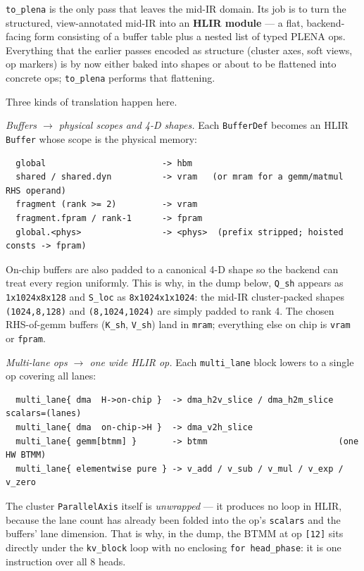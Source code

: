 \documentclass[
  10pt,
]{article}
\begin{document}
\texttt{to\_plena} is the only pass that leaves the mid-IR domain. Its
job is to turn the structured, view-annotated mid-IR into an
\textbf{HLIR module} --- a flat, backend-facing form consisting of a
buffer table plus a nested list of typed PLENA ops. Everything that the
earlier passes encoded as structure (cluster axes, soft views, op
markers) is by now either baked into shapes or about to be flattened
into concrete ops; \texttt{to\_plena} performs that flattening.

Three kinds of translation happen here.

\emph{Buffers \(\rightarrow\) physical scopes and 4-D shapes.} Each
\texttt{BufferDef} becomes an HLIR \texttt{Buffer} whose scope is the
physical memory:

\begin{verbatim}
  global                       -> hbm
  shared / shared.dyn          -> vram   (or mram for a gemm/matmul RHS operand)
  fragment (rank >= 2)         -> vram
  fragment.fpram / rank-1      -> fpram
  global.<phys>                -> <phys>  (prefix stripped; hoisted consts -> fpram)
\end{verbatim}

On-chip buffers are also padded to a canonical 4-D shape so the backend
can treat every region uniformly. This is why, in the dump below,
\texttt{Q\_sh} appears as \texttt{1x1024x8x128} and \texttt{S\_loc} as
\texttt{8x1024x1x1024}: the mid-IR cluster-packed shapes
\texttt{(1024,8,128)} and \texttt{(8,1024,1024)} are simply padded to
rank 4. The chosen RHS-of-gemm buffers (\texttt{K\_sh}, \texttt{V\_sh})
land in \texttt{mram}; everything else on chip is \texttt{vram} or
\texttt{fpram}.

\emph{Multi-lane ops \(\rightarrow\) one wide HLIR op.} Each
\texttt{multi\_lane} block lowers to a single op covering all lanes:

\begin{verbatim}
  multi_lane{ dma  H->on-chip }  -> dma_h2v_slice / dma_h2m_slice  scalars=(lanes)
  multi_lane{ dma  on-chip->H }  -> dma_v2h_slice
  multi_lane{ gemm[btmm] }       -> btmm                          (one HW BTMM)
  multi_lane{ elementwise pure } -> v_add / v_sub / v_mul / v_exp / v_zero
\end{verbatim}

The cluster \texttt{ParallelAxis} itself is \emph{unwrapped} --- it
produces no loop in HLIR, because the lane count has already been folded
into the op's \texttt{scalars} and the buffers' lane dimension. That is
why, in the dump, the BTMM at op \texttt{[12]} sits directly under the
\texttt{kv\_block} loop with no enclosing \texttt{for head\_phase}: it is
one instruction over all 8 heads.
\end{document}
